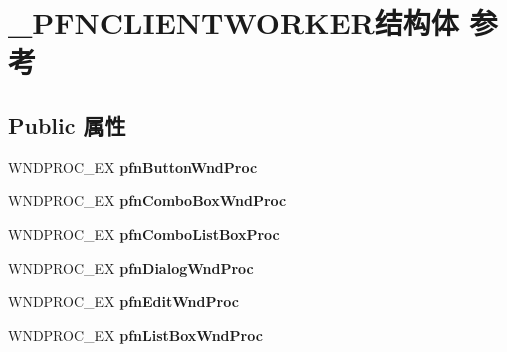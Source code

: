 \hypertarget{struct___p_f_n_c_l_i_e_n_t_w_o_r_k_e_r}{}\section{\+\_\+\+P\+F\+N\+C\+L\+I\+E\+N\+T\+W\+O\+R\+K\+E\+R结构体 参考}
\label{struct___p_f_n_c_l_i_e_n_t_w_o_r_k_e_r}
\subsection*{Public 属性}
\begin{DoxyCompactItemize}
\item 
\mbox{\label{struct___p_f_n_c_l_i_e_n_t_w_o_r_k_e_r_abdde1a56802a7543d9919cf553af69a9}} 
W\+N\+D\+P\+R\+O\+C\+\_\+\+EX {\bfseries pfn\+Button\+Wnd\+Proc}
\item 
\mbox{\label{struct___p_f_n_c_l_i_e_n_t_w_o_r_k_e_r_a71a6e38234b8fc43ac2c88662c725a69}} 
W\+N\+D\+P\+R\+O\+C\+\_\+\+EX {\bfseries pfn\+Combo\+Box\+Wnd\+Proc}
\item 
\mbox{\label{struct___p_f_n_c_l_i_e_n_t_w_o_r_k_e_r_a2afd6b559c8852eaeab5d31be6ab2086}} 
W\+N\+D\+P\+R\+O\+C\+\_\+\+EX {\bfseries pfn\+Combo\+List\+Box\+Proc}
\item 
\mbox{\label{struct___p_f_n_c_l_i_e_n_t_w_o_r_k_e_r_a0a4afdcf990f91dcfc18db37de51c418}} 
W\+N\+D\+P\+R\+O\+C\+\_\+\+EX {\bfseries pfn\+Dialog\+Wnd\+Proc}
\item 
\mbox{\label{struct___p_f_n_c_l_i_e_n_t_w_o_r_k_e_r_a8421f8e13baa2aaed653c6fb637c73be}} 
W\+N\+D\+P\+R\+O\+C\+\_\+\+EX {\bfseries pfn\+Edit\+Wnd\+Proc}
\item 
\mbox{\label{struct___p_f_n_c_l_i_e_n_t_w_o_r_k_e_r_aca0eb8271f4e737a2c36b2d6e4712347}} 
W\+N\+D\+P\+R\+O\+C\+\_\+\+EX {\bfseries pfn\+List\+Box\+Wnd\+Proc}
\item 
\mbox{\label{struct___p_f_n_c_l_i_e_n_t_w_o_r_k_e_r_a75a78aa78d55ec19a68e5d1504e34af3}} 

\end{DoxyCompactItemize}
